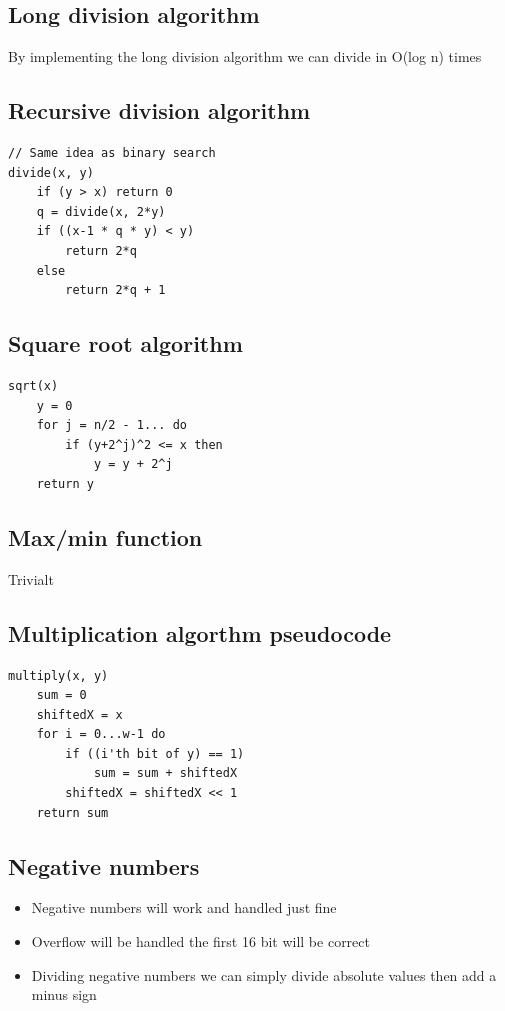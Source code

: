 \documentclass[12pt,a4paper]{article}
\begin{document}
\subsection{Long division algorithm}
By implementing the long division algorithm we can divide in O(log n) times

\subsection{Recursive division algorithm}
\begin{verbatim}
// Same idea as binary search
divide(x, y)
    if (y > x) return 0
    q = divide(x, 2*y)
    if ((x-1 * q * y) < y)
        return 2*q
    else
        return 2*q + 1
\end{verbatim}

\subsection{Square root algorithm}
\begin{verbatim}
sqrt(x)
    y = 0
    for j = n/2 - 1... do
        if (y+2^j)^2 <= x then
            y = y + 2^j
    return y
\end{verbatim}

\subsection{Max/min function}
Trivialt

\subsection{Multiplication algorthm pseudocode}
\begin{verbatim}
multiply(x, y)
    sum = 0
    shiftedX = x
    for i = 0...w-1 do
        if ((i'th bit of y) == 1)
            sum = sum + shiftedX
        shiftedX = shiftedX << 1
    return sum 
\end{verbatim}

\subsection{Negative numbers}
\begin{itemize}
    \item Negative numbers will work and handled just fine
    \item Overflow will be handled the first 16 bit will be correct
    \item Dividing negative numbers we can simply divide absolute values then add a minus sign 
\end{itemize}
\end{document}
